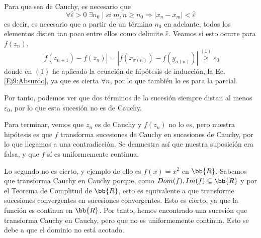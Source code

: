 \begin{ejercicio}
\begin{description}
\begin{itemize}
            Para que sea de Cauchy, es necesario que
            \begin{equation*}
                \forall \hat{\varepsilon}>0\;\exists n_0 \mid si\; m,n\geq n_0 \Longrightarrow |x_n - x_m| < \hat{\varepsilon}
            \end{equation*}
            es decir, es necesario que a partir de un término $n_0$ en adelante, todos los elementos disten tan poco entre ellos como delimite $\hat{\varepsilon}$. Veamos si esto ocurre para $f(z_n)$.
            \begin{equation*}
                |f(z_{n+1})-f(z_{n})| = |f(x_{\sigma (n)}) - f(y_{\sigma (n)})| \stackrel{(1)}{\geq} \varepsilon_0
            \end{equation*}
            donde en $(1)$ he aplicado la ecuación de hipótesis de inducción, la Ec. \ref{Ej9:Absurdo}, ya que es cierta $\forall n$, por lo que también lo es para la parcial.

            Por tanto, podemos ver que dos términos de la sucesión siempre distan al menos $\varepsilon_0$, por lo que esta sucesión no es de Cauchy.

            Para terminar, vemos que $z_n$ es de Cauchy y $f(z_n)$ no lo es, pero nuestra hipótesis es que $f$ transforma sucesiones de Cauchy en sucesiones de Cauchy, por lo que llegamos a una contradicción. Se demuestra así que nuestra suposición era falsa, y que $f$ sí es uniformemente continua.
        \end{itemize}
    \end{description}

    Lo segundo no es cierto, y ejemplo de ello es $f(x)=x^2$ en $\bb{R}$. Sabemos que transforma Cauchy en Cauchy porque, como $Dom(f),Im(f)\subseteq \bb{R}$ y por el Teorema de Complitud de $\bb{R}$, esto es equivalente a que transforme sucesiones convergentes en sucesiones convergentes. Esto es cierto, ya que la función es continua en $\bb{R}$. Por tanto, hemos encontrado una sucesión que transforma Cauchy en Cauchy, pero que no es uniformemente continua. Esto se debe a que el dominio no está acotado.
\end{ejercicio}

